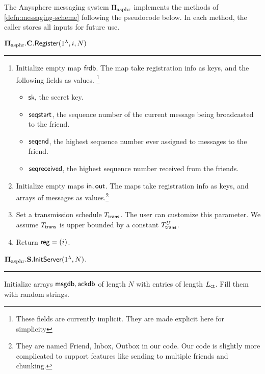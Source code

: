 \begin{definition}
\label{defn:asphr-code}
The Anysphere messaging system $\Pi_{\text{asphr}}$ implements the methods of \cref{defn:messaging-scheme} following the pseudocode below. In each method, the caller stores all inputs for future use.
\vspace{10pt}

$\mathbf{\Pi_{\text{asphr}}.C.\mathsf{Register}}(1^{\lambda}, i, N)$
\vspace{5pt}
\hrule
\vspace{5pt}
\begin{enumerate}
    \item Initialize empty map $\mathsf{frdb}$. The map take registration info as keys, and the following fields as values.    \footnote{These fields are currently implicit. They are made explicit here for simplicity}
    \begin{itemize}
        \item $\mathsf{sk}$, the secret key.
        \item $\mathsf{seqstart}$, the sequence number of the current message being broadcasted to the friend.
        \item $\mathsf{seqend}$, the highest sequence number ever assigned to messages to the friend.
        \item $\mathsf{seqreceived}$, the highest sequence number received from the friends.
    \end{itemize}

    \item Initialize empty maps $\mathsf{in}, \mathsf{out}$. The maps take registration info as keys, and arrays of messages as values.\footnote{They are named Friend, Inbox, Outbox in our code. Our code is slightly more complicated to support features like sending to multiple friends and chunking.}
    \item Set a transmission schedule $T_{\mathsf{trans}}$. The user can customize this parameter. We assume $T_{\mathsf{trans}}$ is upper bounded by a constant $T_{\mathsf{trans}}^U$.
    \item Return $\mathsf{reg} = (i)$.
\end{enumerate}
\vspace{10pt}
$\mathbf{\Pi_{\text{asphr}}.S.\mathsf{InitServer}}(1^{\lambda}, N)$.
\vspace{5pt}
\hrule
\vspace{5pt}
Initialize arrays $\mathsf{msgdb}, \mathsf{ackdb}$ of length $N$ with entries of length $L_{\mathsf{ct}}$. Fill them with random strings.


\end{definition}
